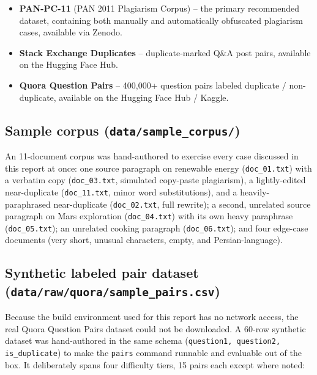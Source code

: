 \documentclass[11pt]{article}
\begin{document}
\begin{itemize}
    \item \textbf{PAN-PC-11} (PAN 2011 Plagiarism Corpus) -- the primary recommended dataset, containing
          both manually and automatically obfuscated plagiarism cases, available via Zenodo.
    \item \textbf{Stack Exchange Duplicates} -- duplicate-marked Q\&A post pairs, available on the
          Hugging Face Hub.
    \item \textbf{Quora Question Pairs} -- 400{,}000+ question pairs labeled duplicate / non-duplicate,
          available on the Hugging Face Hub / Kaggle.
\end{itemize}

\subsection{Sample corpus (\texttt{data/sample\_corpus/})}

An 11-document corpus was hand-authored to exercise every case discussed in this report at once:
one source paragraph on renewable energy (\verb|doc_01.txt|) with a verbatim copy (\verb|doc_03.txt|,
simulated copy-paste plagiarism), a lightly-edited near-duplicate (\verb|doc_11.txt|, minor word
substitutions), and a heavily-paraphrased near-duplicate (\verb|doc_02.txt|, full rewrite); a second,
unrelated source paragraph on Mars exploration (\verb|doc_04.txt|) with its own heavy paraphrase
(\verb|doc_05.txt|); an unrelated cooking paragraph (\verb|doc_06.txt|); and four edge-case documents
(very short, unusual characters, empty, and Persian-language).

\subsection{Synthetic labeled pair dataset (\texttt{data/raw/quora/sample\_pairs.csv})}

Because the build environment used for this report has no network access, the real Quora Question Pairs
dataset could not be downloaded. A 60-row synthetic dataset was hand-authored in the same schema
(\verb|question1, question2, is_duplicate|) to make the \texttt{pairs} command runnable and evaluable out
of the box. It deliberately spans four difficulty tiers, 15 pairs each except where noted:
\end{document}
